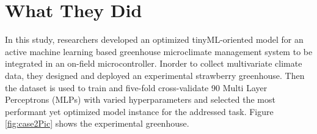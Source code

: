\documentclass[../../main]{subfiles}
\begin{document}
\section{What They Did} \label{sec:}

In this study\cite{microclimate}, researchers developed an optimized tinyML-oriented
model for an active machine learning based greenhouse microclimate management system
to be integrated in an on-field microcontroller. Inorder to collect multivariate climate data,
they designed and deployed an experimental strawberry greenhouse.
Then the dataset is used to train and five-fold cross-validate 90 Multi Layer Perceptrons (MLPs)
with varied hyperparameters and selected the most performant yet optimized model instance for the addressed task.
Figure \ref{fig:case2Pic} shows the experimental greenhouse.
\end{document}
